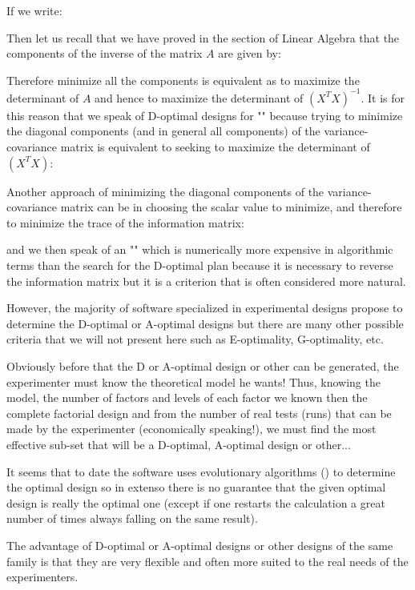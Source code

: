	If we write:
	
	Then let us recall that we have proved in the section of Linear Algebra that the components of the inverse of the matrix $A$ are given by:
	
	Therefore minimize all the components is equivalent as to maximize the determinant of $A$ and hence to maximize the determinant of $(X^TX)^{-1}$. It is for this reason that we speak of D-optimal designs for "" because trying to minimize the diagonal components (and in general all components) of the variance-covariance matrix is equivalent to seeking to maximize the determinant of $(X^TX)$:
	
	Another approach of minimizing the diagonal components of the variance-covariance matrix can be in choosing the scalar value to minimize, and therefore to minimize the trace of the information matrix:
	
 	and we then speak of an "" which is numerically more expensive in algorithmic terms than the search for the D-optimal plan because it is necessary to reverse the information matrix but it is a criterion that is often considered more natural.

	However, the majority of software specialized in experimental designs propose to determine the D-optimal or A-optimal designs but there are many other possible criteria that we will not present here such as E-optimality, G-optimality, etc.

	Obviously before that the D or A-optimal design or other can be generated, the experimenter must know the theoretical model he wants! Thus, knowing the model, the number of factors and levels of each factor we known then the complete factorial design and from the number of real tests (runs) that can be made by the experimenter (economically speaking!), we must find the most effective sub-set that will be a D-optimal, A-optimal design or other...

	It seems that to date the software uses evolutionary algorithms () to determine the optimal design so in extenso there is no guarantee that the given optimal design is really the optimal one (except if one restarts the calculation a great number of times always falling on the same result).

	The advantage of D-optimal or A-optimal designs or other designs of the same family is that they are very flexible and often more suited to the real needs of the experimenters.
	
